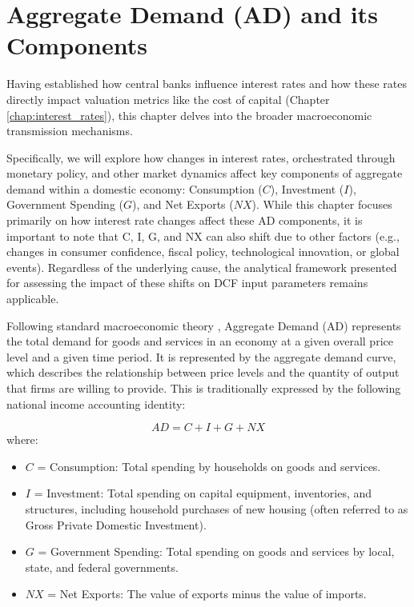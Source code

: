 \chapter{Aggregate Demand (AD) and its Components} \label{chap:aggregate_demand}

Having established how central banks influence interest rates and how these rates directly impact valuation metrics like the cost of capital (Chapter \ref{chap:interest_rates}), this chapter delves into the broader macroeconomic transmission mechanisms.

Specifically, we will explore how changes in interest rates, orchestrated through monetary policy, and other market dynamics affect key components of aggregate demand within a domestic economy: Consumption (\(C\)), Investment (\(I\)), Government Spending (\(G\)), and Net Exports (\(NX\)). While this chapter focuses primarily on how interest rate changes affect these AD components, it is important to note that C, I, G, and NX can also shift due to other factors (e.g., changes in consumer confidence, fiscal policy, technological innovation, or global events). Regardless of the underlying cause, the analytical framework presented for assessing the impact of these shifts on DCF input parameters remains applicable.

Following standard macroeconomic theory \parencite{blanchard2021macroeconomics, mankiw2022macroeconomics}, Aggregate Demand (AD) represents the total demand for goods and services in an economy at a given overall price level and a given time period. It is represented by the aggregate demand curve, which describes the relationship between price levels and the quantity of output that firms are willing to provide. This is traditionally expressed by the following national income accounting identity:

\begin{equation} \label{eq:ad}
    AD = C + I + G + NX
\end{equation}
where:
\begin{itemize}
    \item \(C\) = Consumption: Total spending by households on goods and services.
    \item \(I\) = Investment: Total spending on capital equipment, inventories, and structures, including household purchases of new housing (often referred to as Gross Private Domestic Investment).
    \item \(G\) = Government Spending: Total spending on goods and services by local, state, and federal governments.
    \item \(NX\) = Net Exports: The value of exports minus the value of imports.
\end{itemize}

